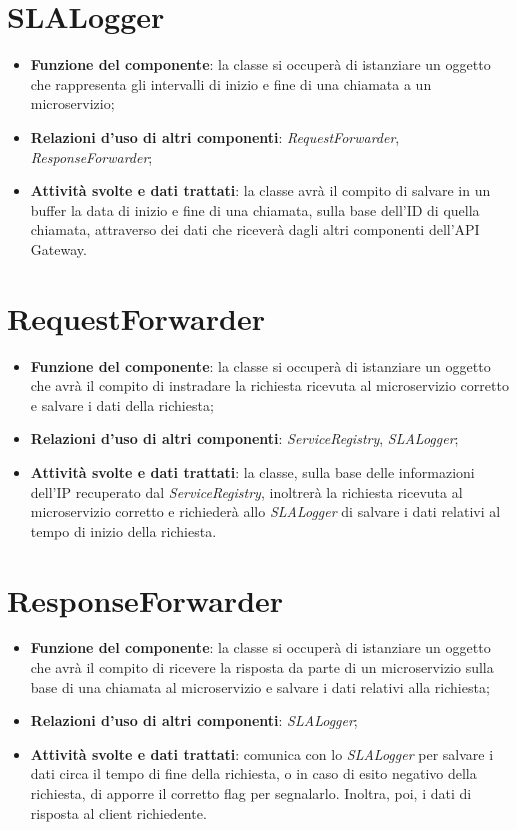 \chapter{\textbf{SLALogger}}
\begin{itemize}
	\item \textbf{Funzione del componente}: la classe si occuper\`{a} di istanziare un oggetto che rappresenta gli intervalli di inizio e fine di una chiamata a un microservizio;
	\item \textbf{Relazioni d'uso di altri componenti}: \textit{RequestForwarder}, \textit{ResponseForwarder};
	\item \textbf{Attivit\`{a} svolte e dati trattati}:  la classe avr\`{a} il compito di salvare in un buffer la data di inizio e fine di una chiamata, sulla base dell'ID di quella chiamata, attraverso dei dati che ricever\`{a} dagli altri componenti dell'API Gateway.	
\end{itemize}

\chapter{\textbf{RequestForwarder}}
\begin{itemize}
	\item \textbf{Funzione del componente}: la classe si occuper\`{a} di istanziare un oggetto che avr\`{a} il compito di instradare la richiesta ricevuta al microservizio corretto e salvare i dati della richiesta;
		\item \textbf{Relazioni d'uso di altri componenti}: \textit{ServiceRegistry}, \textit{SLALogger};
		\item \textbf{Attivit\`{a} svolte e dati trattati}: la classe, sulla base delle informazioni dell'IP recuperato dal \textit{ServiceRegistry}, inoltrer\`{a} la richiesta ricevuta al microservizio corretto e richieder\`{a} allo \textit{SLALogger} di salvare i dati relativi al tempo di inizio della richiesta.
\end{itemize}

\chapter{\textbf{ResponseForwarder}}
\begin{itemize}
	\item \textbf{Funzione del componente}: la classe si occuper\`{a} di istanziare un oggetto che avr\`{a} il compito di ricevere la risposta da parte di un microservizio sulla base di una chiamata al microservizio e salvare i dati relativi alla richiesta;
	\item \textbf{Relazioni d'uso di altri componenti}: \textit{SLALogger};
	\item \textbf{Attivit\`{a} svolte e dati trattati}: comunica con lo \textit{SLALogger} per salvare i dati circa il tempo di fine della richiesta, o in caso di esito negativo della richiesta, di apporre il corretto flag per segnalarlo. Inoltra, poi, i dati di risposta al client richiedente.
\end{itemize}

